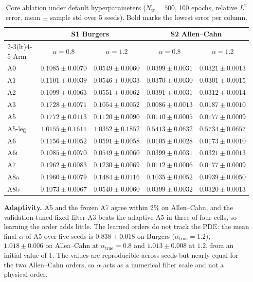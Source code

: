 \documentclass[conference]{IEEEtran}
\begin{document}
\begin{table}[t]
\caption{Core ablation under default hyperparameters ($N_{\mathrm{tr}}=500$, 100 epochs, relative $L^2$ error, mean $\pm$ sample std over 5 seeds). Bold marks the lowest error per column.}
\label{tab:core}
\centering
\scriptsize
\setlength{\tabcolsep}{6pt}
\begin{tabular}{lcccc}
\toprule
 & \multicolumn{2}{c}{S1 Burgers} & \multicolumn{2}{c}{S2 Allen--Cahn} \\
\cmidrule(lr){2-3}\cmidrule(lr){4-5}
Arm & $\alpha=0.8$ & $\alpha=1.2$ & $\alpha=0.8$ & $\alpha=1.2$ \\
\midrule
A0 & $0.1085\pm0.0070$ & $0.0549\pm0.0060$ & $0.0399\pm0.0031$ & $0.0321\pm0.0013$ \\
A1 & $0.1101\pm0.0039$ & $0.0546\pm0.0033$ & $0.0370\pm0.0030$ & $0.0301\pm0.0015$ \\
A2 & $0.1099\pm0.0063$ & $0.0551\pm0.0062$ & $0.0391\pm0.0031$ & $0.0312\pm0.0014$ \\
A3 & $0.1728\pm0.0071$ & $0.1054\pm0.0052$ & $\mathbf{0.0086\pm0.0013}$ & $0.0187\pm0.0010$ \\
A5 & $0.1772\pm0.0113$ & $0.1120\pm0.0090$ & $0.0110\pm0.0005$ & $0.0177\pm0.0009$ \\
A5-leg & $1.0155\pm0.1611$ & $1.0352\pm0.1852$ & $0.5413\pm0.0632$ & $0.5734\pm0.0657$ \\
A6 & $0.1156\pm0.0052$ & $0.0591\pm0.0058$ & $0.0105\pm0.0028$ & $\mathbf{0.0173\pm0.0010}$ \\
A6i & $0.1085\pm0.0070$ & $0.0549\pm0.0060$ & $0.0399\pm0.0031$ & $0.0321\pm0.0013$ \\
A7 & $0.1962\pm0.0083$ & $0.1230\pm0.0069$ & $0.0112\pm0.0006$ & $0.0177\pm0.0009$ \\
A8a & $0.1960\pm0.0079$ & $0.1484\pm0.0116$ & $0.1035\pm0.0052$ & $0.0939\pm0.0050$ \\
A8b & $\mathbf{0.1073\pm0.0067}$ & $\mathbf{0.0540\pm0.0060}$ & $0.0399\pm0.0032$ & $0.0320\pm0.0013$ \\
\bottomrule
\end{tabular}
\end{table}

\textbf{Adaptivity.} A5 and the frozen A7 agree within 2\% on Allen--Cahn, and the validation-tuned fixed filter A3 beats the adaptive A5 in three of four cells, so learning the order adds little. The learned orders do not track the PDE: the mean final $\alpha$ of A5 over five seeds is $0.838\pm0.018$ on Burgers ($\alpha_{\mathrm{true}}=1.2$), $1.018\pm0.006$ on Allen--Cahn at $\alpha_{\mathrm{true}}=0.8$ and $1.013\pm0.008$ at $1.2$, from an initial value of 1. The values are reproducible across seeds but nearly equal for the two Allen--Cahn orders, so $\alpha$ acts as a numerical filter scale and not a physical order.
\end{document}
